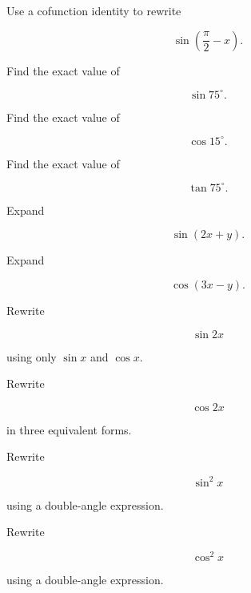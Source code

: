 \begin{exercise}[2]
Use a cofunction identity to rewrite

\[
\sin\left(\frac{\pi}{2}-x\right).
\]
\end{exercise}

\begin{exercise}[2]
Find the exact value of

\[
\sin75^\circ.
\]
\end{exercise}

\begin{exercise}[2]
Find the exact value of

\[
\cos15^\circ.
\]
\end{exercise}

\begin{exercise}[2]
Find the exact value of

\[
\tan75^\circ.
\]
\end{exercise}

\begin{exercise}[2]
Expand

\[
\sin(2x+y).
\]
\end{exercise}

\begin{exercise}[2]
Expand

\[
\cos(3x-y).
\]
\end{exercise}

\begin{exercise}[2]
Rewrite

\[
\sin2x
\]

using only \(\sin x\) and \(\cos x\).
\end{exercise}

\begin{exercise}[2]
Rewrite

\[
\cos2x
\]

in three equivalent forms.
\end{exercise}

\begin{exercise}[2]
Rewrite

\[
\sin^2x
\]

using a double-angle expression.
\end{exercise}

\begin{exercise}[2]
Rewrite

\[
\cos^2x
\]

using a double-angle expression.
\end{exercise}

